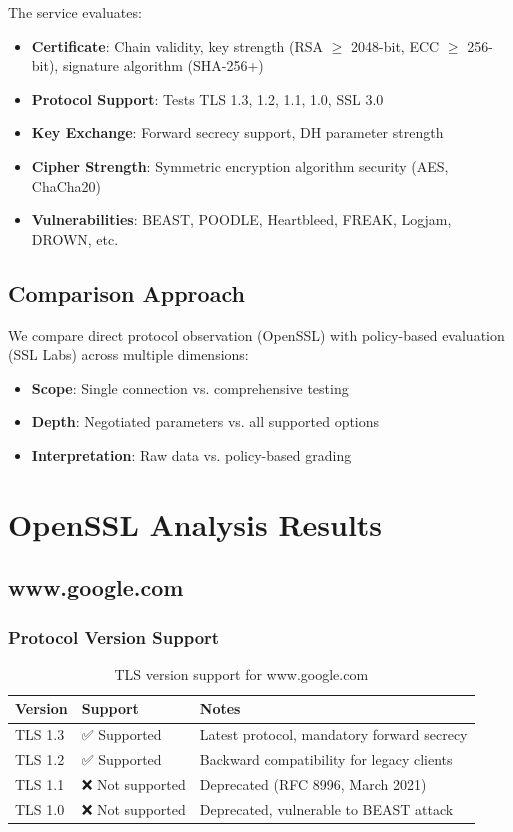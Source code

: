 \documentclass[12pt,a4paper]{article}
\begin{document}
The service evaluates:
\begin{itemize}
    \item \textbf{Certificate}: Chain validity, key strength (RSA $\geq$ 2048-bit, ECC $\geq$ 256-bit), signature algorithm (SHA-256+)
    \item \textbf{Protocol Support}: Tests TLS 1.3, 1.2, 1.1, 1.0, SSL 3.0
    \item \textbf{Key Exchange}: Forward secrecy support, DH parameter strength
    \item \textbf{Cipher Strength}: Symmetric encryption algorithm security (AES, ChaCha20)
    \item \textbf{Vulnerabilities}: BEAST, POODLE, Heartbleed, FREAK, Logjam, DROWN, etc.
\end{itemize}

\subsection{Comparison Approach}

We compare direct protocol observation (OpenSSL) with policy-based evaluation (SSL Labs) across multiple dimensions:
\begin{itemize}
    \item \textbf{Scope}: Single connection vs. comprehensive testing
    \item \textbf{Depth}: Negotiated parameters vs. all supported options
    \item \textbf{Interpretation}: Raw data vs. policy-based grading
\end{itemize}

\section{OpenSSL Analysis Results}

\subsection{www.google.com}

\subsubsection{Protocol Version Support}

\begin{table}[H]
\centering
\begin{tabular}{@{}llp{6cm}@{}}
\toprule
\textbf{Version} & \textbf{Support} & \textbf{Notes} \\ \midrule
TLS 1.3 & ✅ Supported & Latest protocol, mandatory forward secrecy \\
TLS 1.2 & ✅ Supported & Backward compatibility for legacy clients \\
TLS 1.1 & ❌ Not supported & Deprecated (RFC 8996, March 2021) \\
TLS 1.0 & ❌ Not supported & Deprecated, vulnerable to BEAST attack \\
\bottomrule
\end{tabular}
\caption{TLS version support for www.google.com}
\end{table}
\end{document}

